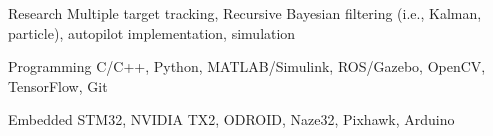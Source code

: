 

\begin{cvskills}

  \cvskill
    {Research} %
    {Multiple target tracking, Recursive Bayesian filtering (i.e., Kalman, particle), autopilot implementation, simulation} %

  \cvskill
    {Programming} %
    {C/C++, Python, MATLAB/Simulink, ROS/Gazebo, OpenCV, TensorFlow, Git} %

  \cvskill
    {Embedded} %
    {STM32, NVIDIA TX2, ODROID, Naze32, Pixhawk, Arduino} %

\end{cvskills}
